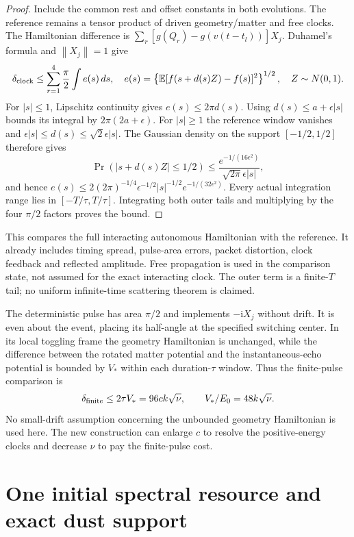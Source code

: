 \documentclass[11pt]{article}
\newcommand{\ii}{\mathrm{i}}
\newcommand{\norm}[1]{\left\lVert#1\right\rVert}
\begin{document}
\begin{proof}
Include the common rest and offset constants in both evolutions.
The reference remains a tensor product of driven geometry/matter and free clocks.
The Hamiltonian difference is $\sum_r[g(Q_r)-g(v(t-t_l))]X_j$.
Duhamel's formula and $\norm{X_j}=1$ give
\begin{equation}
 \delta_{\rm clock}\le\sum_{r=1}^4\frac\pi2\int e(s)\,ds,
 \quad e(s)=\left\{\mathbb E[f(s+d(s)Z)-f(s)]^2\right\}^{1/2},
 \quad Z\sim N(0,1).\label{eq:exactclockintegral}
\end{equation}
For $|s|\le1$, Lipschitz continuity gives $e(s)\le2\pi d(s)$.
Using $d(s)\le a+\epsilon|s|$ bounds its integral by $2\pi(2a+\epsilon)$.
For $|s|\ge1$ the reference window vanishes and $\epsilon|s|\le d(s)\le\sqrt2\epsilon|s|$.
The Gaussian density on the support $[-1/2,1/2]$ therefore gives
\[
 \Pr(|s+d(s)Z|\le1/2)
 \le\frac{e^{-1/(16\epsilon^2)}}{\sqrt{2\pi}\epsilon|s|},
\]
and hence $e(s)\le2(2\pi)^{-1/4}\epsilon^{-1/2}|s|^{-1/2}e^{-1/(32\epsilon^2)}$.
Every actual integration range lies in $[-T/\tau,T/\tau]$.
Integrating both outer tails and multiplying by the four $\pi/2$ factors proves the bound.
\end{proof}

This compares the full interacting autonomous Hamiltonian with the reference.
It already includes timing spread, pulse-area errors, packet distortion, clock feedback and reflected amplitude.
Free propagation is used in the comparison state, not assumed for the exact interacting clock.
The outer term is a finite-$T$ tail; no uniform infinite-time scattering theorem is claimed.

The deterministic pulse has area $\pi/2$ and implements $-\ii X_j$ without drift.
It is even about the event, placing its half-angle at the specified switching center.
In its local toggling frame the geometry Hamiltonian is unchanged, while the difference between the rotated matter potential and the instantaneous-echo potential is bounded by $V_*$ within each duration-$\tau$ window.
Thus the finite-pulse comparison is
\begin{equation}
 \delta_{\rm finite}\le2\tau V_*=96ck\sqrt\nu,
 \qquad V_*/E_0=48k\sqrt\nu.\label{eq:finitepulse}
\end{equation}
No small-drift assumption concerning the unbounded geometry Hamiltonian is used here.
The new construction can enlarge $c$ to resolve the positive-energy clocks and decrease $\nu$ to pay the finite-pulse cost.

\section{One initial spectral resource and exact dust support}\label{sec:filter}
\end{document}
